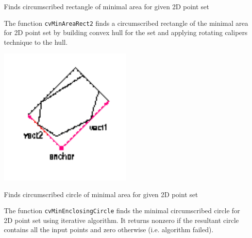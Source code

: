 \label{MinAreaRect2}

Finds circumscribed rectangle of minimal area for given 2D point set


\begin{description}
\end{description}

The function \texttt{cvMinAreaRect2} finds a circumscribed rectangle of the minimal area for 2D point set by building convex hull for the set and applying rotating calipers technique to the hull.

\includegraphics[width=0.5\textwidth]{pics/minareabox.png}

\label{MinEnclosingCircle}

Finds circumscribed circle of minimal area for given 2D point set


\begin{description}
\end{description}

The function \texttt{cvMinEnclosingCircle} finds the minimal circumscribed
circle for 2D point set using iterative algorithm. It returns nonzero
if the resultant circle contains all the input points and zero otherwise
(i.e. algorithm failed).

